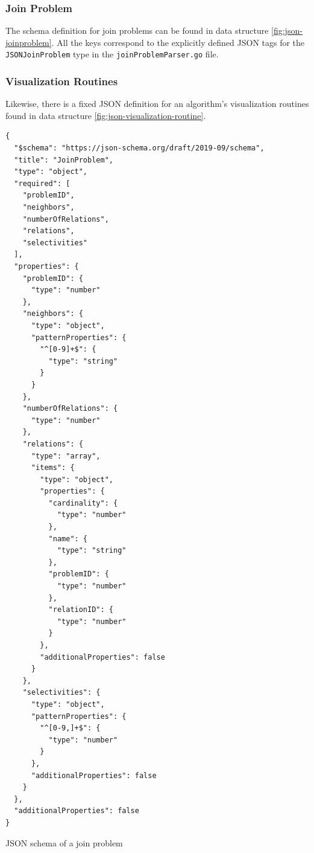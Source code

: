 \subsubsection{Join Problem}
\label{subsub:join-problem-data-structure}

The schema definition for join problems can be found in data structure \ref{fig:json-joinproblem}.
All the keys correspond to the explicitly defined JSON tags for the \texttt{JSONJoinProblem} type in the \texttt{joinProblemParser.go} file.

\subsubsection{Visualization Routines}
Likewise, there is a fixed JSON definition for an algorithm's visualization routines found in data structure \ref{fig:json-visualization-routine}.

\begin{code}
\begin{verbatim}
{
  "$schema": "https://json-schema.org/draft/2019-09/schema",
  "title": "JoinProblem",
  "type": "object",
  "required": [
    "problemID",
    "neighbors",
    "numberOfRelations",
    "relations",
    "selectivities"
  ],
  "properties": {
    "problemID": {
      "type": "number"
    },
    "neighbors": {
      "type": "object",
      "patternProperties": {
        "^[0-9]+$": {
          "type": "string"
        }
      }
    },
    "numberOfRelations": {
      "type": "number"
    },
    "relations": {
      "type": "array",
      "items": {
        "type": "object",
        "properties": {
          "cardinality": {
            "type": "number"
          },
          "name": {
            "type": "string"
          },
          "problemID": {
            "type": "number"
          },
          "relationID": {
            "type": "number"
          }
        },
        "additionalProperties": false
      }
    },
    "selectivities": {
      "type": "object",
      "patternProperties": {
        "^[0-9,]+$": {
          "type": "number"
        }
      },
      "additionalProperties": false
    }
  },
  "additionalProperties": false
}
\end{verbatim}
\caption{JSON schema of a join problem}
\label{fig:json-joinproblem}
\end{code}

